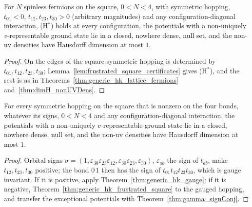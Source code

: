 \begin{theorem}
  \label{thm:generic_hk_frustrated_square}
  \leanok
  For $N$ spinless fermions on the square, $0<N<4$, with symmetric hopping, $t_{01}<0$, $t_{12},t_{23},t_{30}>0$
  (arbitrary magnitudes) and any configuration-diagonal interaction, (H$^*$) holds at every configuration, the
  potentials with a non-uniquely $v$-representable ground state lie in a closed, nowhere dense, null set, and the
  non-uv densities have Hausdorff dimension at most $1$.
\end{theorem}
\begin{proof}
  \leanok
  On the edges of the square symmetric hopping is determined by $t_{01},t_{12},t_{23},t_{30}$;
  Lemma~\ref{lem:frustrated_square_certificates} gives (H$^*$), and the rest is as in
  Theorems~\ref{thm:generic_hk_lattice_fermions} and~\ref{thm:dimH_nonUVDens}.
\end{proof}

\begin{theorem}
  \label{thm:generic_hk_square_of_ne_zero}
  \leanok
  For every symmetric hopping on the square that is nonzero on the four bonds, whatever its signs, $0<N<4$ and any
  configuration-diagonal interaction, the potentials with a non-uniquely $v$-representable ground state lie in a
  closed, nowhere dense, null set, and the non-uv densities have Hausdorff dimension at most $1$.
\end{theorem}
\begin{proof}
  \leanok
  Orbital signs $\sigma=(1,\varepsilon_{30}\varepsilon_{23}\varepsilon_{12},\varepsilon_{30}\varepsilon_{23},
  \varepsilon_{30})$, $\varepsilon_{ab}$ the sign of $t_{ab}$, make $t_{12},t_{23},t_{30}$ positive; the bond
  $0\,1$ then has the sign of $t_{01}t_{12}t_{23}t_{30}$, which is gauge invariant. If it is positive, apply
  Theorem~\ref{thm:generic_hk_gauge}; if it is negative, Theorem~\ref{thm:generic_hk_frustrated_square} to the
  gauged hopping, and transfer the exceptional potentials with Theorem~\ref{thm:gamma_signConj}.
\end{proof}

